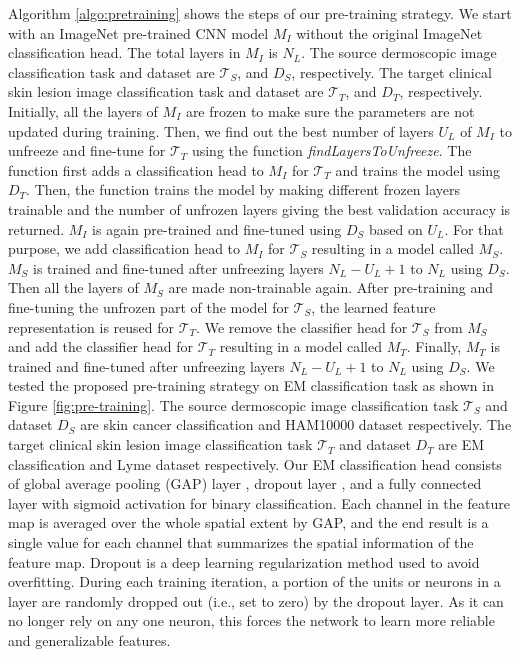 Algorithm \ref{algo:pretraining} shows the steps of our pre-training strategy. We start with an ImageNet pre-trained CNN model $M_{I}$ without the original ImageNet classification head. The total layers in $M_{I}$ is $N_{L}$. The source dermoscopic image classification task and dataset are $\mathcal{T}_{S}$, and $D_{S}$, respectively. The target clinical skin lesion image classification task and dataset are $\mathcal{T}_{T}$, and $D_{T}$, respectively. Initially, all the layers of $M_{I}$ are frozen to make sure the parameters are not updated during training. Then, we find out the best number of layers $U_{L}$ of $M_{I}$ to unfreeze and fine-tune for  $\mathcal{T}_{T}$ using the function \textit{findLayersToUnfreeze}. The function first adds a classification head to $M_{I}$ for $\mathcal{T}_{T}$ and trains the model using $D_{T}$. Then, the function trains the model by making different frozen layers trainable and the number of unfrozen layers giving the best validation accuracy is returned. $M_{I}$ is again pre-trained and fine-tuned using $D_{S}$ based on $U_{L}$. For that purpose, we add classification head to  $M_{I}$  for $\mathcal{T}_{S}$ resulting in a model called $M_{S}$. $M_{S}$ is trained and fine-tuned after unfreezing layers $N_{L}-U_{L}+1$ to $N_{L}$ using $D_{S}$. Then all the layers of $M_{S}$ are made non-trainable again. After pre-training and fine-tuning the unfrozen part of the model for $\mathcal{T}_{S}$, the learned feature representation is reused for $\mathcal{T}_{T}$. We remove the classifier head for $\mathcal{T}_{S}$ from $M_{S}$ and add the classifier head for $\mathcal{T}_{T}$ resulting in a model called $M_{T}$. Finally, $M_{T}$ is trained and fine-tuned after unfreezing layers $N_{L}-U_{L}+1$ to $N_{L}$ using $D_{S}$. We tested the proposed pre-training strategy on EM classification task as shown in Figure \ref{fig:pre-training}. The source dermoscopic image classification task $\mathcal{T}_{S}$ and dataset $D_{S}$ are skin cancer classification and HAM10000 dataset respectively. The target clinical skin lesion image classification task $\mathcal{T}_{T}$ and dataset $D_{T}$ are EM classification and Lyme dataset respectively. Our EM classification head consists of global average pooling (GAP) layer \cite{Lin2014}, dropout layer \cite{Srivastava2014}, and a fully connected layer with sigmoid activation for binary classification. Each channel in the feature map is averaged over the whole spatial extent by GAP, and the end result is a single value for each channel that summarizes the spatial information of the feature map. Dropout is a deep learning regularization method used to avoid overfitting. During each training iteration, a portion of the units or neurons in a layer are randomly dropped out (i.e., set to zero) by the dropout layer. As it can no longer rely on any one neuron, this forces the network to learn more reliable and generalizable features.
